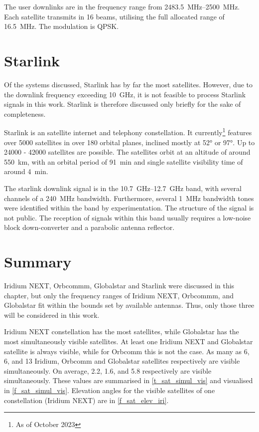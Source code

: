 The user downlinks are in the frequency range from \qtyrange{2483.5}{2500}{MHz}. Each satellite transmits in 16 beams, utilising the full allocated range of \qty{16.5}{MHz}. The modulation is QPSK\cite{sat14}.

\section{Starlink}
Of the systems discussed, Starlink has by far the most satellites. However, due to the downlink frequency exceeding \qty{10}{GHz}, it is not feasible to process Starlink signals in this work. Starlink is therefore discussed only briefly for the sake of completeness.

Starlink is an satellite internet and telephony constellation. It currently\footnote{As of October 2023} features over \num{5000} satellites in over 180 orbital planes, inclined mostly at \ang{52} or \ang{97}. Up to 24000 - 42000 satellites are possible\cite{sop02}. The satellites orbit at an altitude of around \qty{550}{km}, with an orbital period of \qty{91}{min} and single satellite visibility time of around \qty{4}{min}.

The starlink downlink signal is in the \qtyrange{10.7}{12.7}{GHz} band, with several channels of a \qty{240}{MHz} bandwidth. Furthermore, several \qty{1}{MHz} bandwidth tones were identified within the band by experimentation. The structure of the signal is not public. The reception of signals within this band usually requires a low-noise block down-converter and a parabolic antenna reflector\cite{sop04}.

\section{Summary}
Iridium NEXT, Orbcommm, Globalstar and Starlink were discussed in this chapter, but only the frequency ranges of Iridium NEXT, Orbcommm, and Globalstar fit within the bounds set by available antennas. Thus, only those three will be considered in this work.

Iridium NEXT constellation has the most satellites, while Globalstar has the most simultaneously visible satellites. At least one Iridium NEXT and Globalstar satellite is always visible, while for Orbcomm this is not the case. As many as 6, 6, and 13 Iridium, Orbcomm and Globalstar satellites respectively are visible simultaneously. On average, 2.2, 1.6, and 5.8 respectively are visible simultaneously. These values are summarised in \autoref{t_sat_simul_vis} and visualised in \autoref{f_sat_simul_vis}. Elevation angles for the visible satellites of one constellation (Iridium NEXT) are in \autoref{f_sat_elev_iri}.

